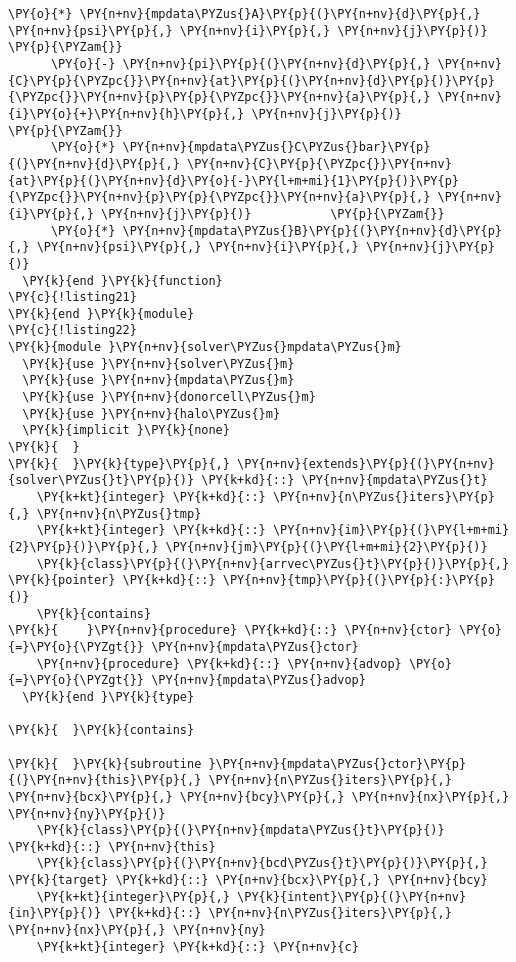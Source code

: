 \begin{Verbatim}[commandchars=\\\{\}]
      \PY{o}{*} \PY{n+nv}{mpdata\PYZus{}A}\PY{p}{(}\PY{n+nv}{d}\PY{p}{,} \PY{n+nv}{psi}\PY{p}{,} \PY{n+nv}{i}\PY{p}{,} \PY{n+nv}{j}\PY{p}{)}                         \PY{p}{\PYZam{}}
      \PY{o}{-} \PY{n+nv}{pi}\PY{p}{(}\PY{n+nv}{d}\PY{p}{,} \PY{n+nv}{C}\PY{p}{\PYZpc{}}\PY{n+nv}{at}\PY{p}{(}\PY{n+nv}{d}\PY{p}{)}\PY{p}{\PYZpc{}}\PY{n+nv}{p}\PY{p}{\PYZpc{}}\PY{n+nv}{a}\PY{p}{,} \PY{n+nv}{i}\PY{o}{+}\PY{n+nv}{h}\PY{p}{,} \PY{n+nv}{j}\PY{p}{)}                     \PY{p}{\PYZam{}}
      \PY{o}{*} \PY{n+nv}{mpdata\PYZus{}C\PYZus{}bar}\PY{p}{(}\PY{n+nv}{d}\PY{p}{,} \PY{n+nv}{C}\PY{p}{\PYZpc{}}\PY{n+nv}{at}\PY{p}{(}\PY{n+nv}{d}\PY{o}{-}\PY{l+m+mi}{1}\PY{p}{)}\PY{p}{\PYZpc{}}\PY{n+nv}{p}\PY{p}{\PYZpc{}}\PY{n+nv}{a}\PY{p}{,} \PY{n+nv}{i}\PY{p}{,} \PY{n+nv}{j}\PY{p}{)}           \PY{p}{\PYZam{}}
      \PY{o}{*} \PY{n+nv}{mpdata\PYZus{}B}\PY{p}{(}\PY{n+nv}{d}\PY{p}{,} \PY{n+nv}{psi}\PY{p}{,} \PY{n+nv}{i}\PY{p}{,} \PY{n+nv}{j}\PY{p}{)}
  \PY{k}{end }\PY{k}{function}
\PY{c}{!listing21}
\PY{k}{end }\PY{k}{module}
\PY{c}{!listing22}
\PY{k}{module }\PY{n+nv}{solver\PYZus{}mpdata\PYZus{}m}
  \PY{k}{use }\PY{n+nv}{solver\PYZus{}m}
  \PY{k}{use }\PY{n+nv}{mpdata\PYZus{}m}
  \PY{k}{use }\PY{n+nv}{donorcell\PYZus{}m}
  \PY{k}{use }\PY{n+nv}{halo\PYZus{}m}
  \PY{k}{implicit }\PY{k}{none}
\PY{k}{  }
\PY{k}{  }\PY{k}{type}\PY{p}{,} \PY{n+nv}{extends}\PY{p}{(}\PY{n+nv}{solver\PYZus{}t}\PY{p}{)} \PY{k+kd}{::} \PY{n+nv}{mpdata\PYZus{}t}
    \PY{k+kt}{integer} \PY{k+kd}{::} \PY{n+nv}{n\PYZus{}iters}\PY{p}{,} \PY{n+nv}{n\PYZus{}tmp}
    \PY{k+kt}{integer} \PY{k+kd}{::} \PY{n+nv}{im}\PY{p}{(}\PY{l+m+mi}{2}\PY{p}{)}\PY{p}{,} \PY{n+nv}{jm}\PY{p}{(}\PY{l+m+mi}{2}\PY{p}{)}
    \PY{k}{class}\PY{p}{(}\PY{n+nv}{arrvec\PYZus{}t}\PY{p}{)}\PY{p}{,} \PY{k}{pointer} \PY{k+kd}{::} \PY{n+nv}{tmp}\PY{p}{(}\PY{p}{:}\PY{p}{)} 
    \PY{k}{contains}
\PY{k}{    }\PY{n+nv}{procedure} \PY{k+kd}{::} \PY{n+nv}{ctor} \PY{o}{=}\PY{o}{\PYZgt{}} \PY{n+nv}{mpdata\PYZus{}ctor}
    \PY{n+nv}{procedure} \PY{k+kd}{::} \PY{n+nv}{advop} \PY{o}{=}\PY{o}{\PYZgt{}} \PY{n+nv}{mpdata\PYZus{}advop}
  \PY{k}{end }\PY{k}{type}

\PY{k}{  }\PY{k}{contains}

\PY{k}{  }\PY{k}{subroutine }\PY{n+nv}{mpdata\PYZus{}ctor}\PY{p}{(}\PY{n+nv}{this}\PY{p}{,} \PY{n+nv}{n\PYZus{}iters}\PY{p}{,} \PY{n+nv}{bcx}\PY{p}{,} \PY{n+nv}{bcy}\PY{p}{,} \PY{n+nv}{nx}\PY{p}{,} \PY{n+nv}{ny}\PY{p}{)}
    \PY{k}{class}\PY{p}{(}\PY{n+nv}{mpdata\PYZus{}t}\PY{p}{)} \PY{k+kd}{::} \PY{n+nv}{this}
    \PY{k}{class}\PY{p}{(}\PY{n+nv}{bcd\PYZus{}t}\PY{p}{)}\PY{p}{,} \PY{k}{target} \PY{k+kd}{::} \PY{n+nv}{bcx}\PY{p}{,} \PY{n+nv}{bcy}
    \PY{k+kt}{integer}\PY{p}{,} \PY{k}{intent}\PY{p}{(}\PY{n+nv}{in}\PY{p}{)} \PY{k+kd}{::} \PY{n+nv}{n\PYZus{}iters}\PY{p}{,} \PY{n+nv}{nx}\PY{p}{,} \PY{n+nv}{ny}
    \PY{k+kt}{integer} \PY{k+kd}{::} \PY{n+nv}{c}


\end{Verbatim}
